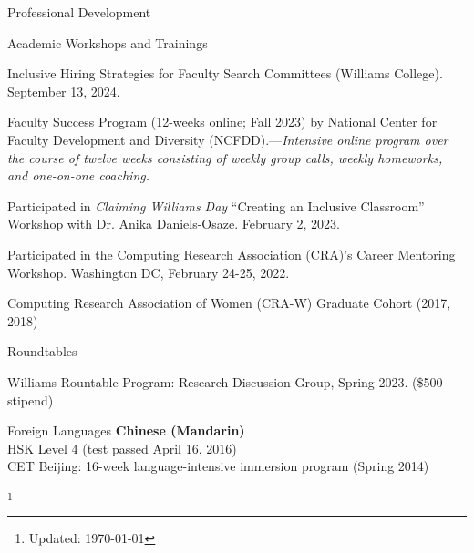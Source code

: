 \documentclass{resume} %
\newcommand\blfootnote[1]{%
  \begingroup
  \renewcommand\thefootnote{}\footnote{#1}%
  \addtocounter{footnote}{-1}%
  \endgroup
}
\begin{document}
\begin{rSection}{Professional Development}


\begin{rSubsection}{Academic Workshops and Trainings}{}{}{}
\item Inclusive Hiring Strategies for Faculty Search Committees (Williams College). September 13, 2024.
\item Faculty Success Program (12-weeks online; Fall 2023) by National Center for Faculty Development and Diversity (NCFDD).---\emph{Intensive online program over the course of twelve weeks consisting of weekly group calls, weekly homeworks, and one-on-one coaching.}
\item Participated in \emph{Claiming Williams Day} ``Creating an Inclusive Classroom'' Workshop with Dr. Anika Daniels-Osaze. February 2, 2023.
\item Participated in the Computing Research Association (CRA)'s Career Mentoring Workshop. Washington DC, February 24-25, 2022. 
\item Computing Research Association of Women (CRA-W) Graduate Cohort (2017, 2018)  
\end{rSubsection}

\begin{rSubsection}{Roundtables}{}{}{}
\item Williams Rountable Program: Research Discussion Group, Spring 2023. (\$500 stipend)
\end{rSubsection}
\end{rSection}

\begin{rSection}{Foreign Languages}
\textbf{Chinese (Mandarin)} \\
HSK Level 4 (test passed April 16, 2016) \\
CET Beijing: 16-week language-intensive immersion program (Spring 2014)
\end{rSection}

\blfootnote{Updated: \today}
\end{document}
